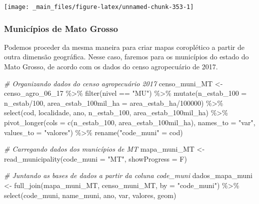 \documentclass[
  brazilian,
]{book}
\newenvironment{Shaded}{\begin{snugshade}}{\end{snugshade}}
\newcommand{\AttributeTok}[1]{\textcolor[rgb]{0.77,0.63,0.00}{#1}}
\newcommand{\CommentTok}[1]{\textcolor[rgb]{0.56,0.35,0.01}{\textit{#1}}}
\newcommand{\DecValTok}[1]{\textcolor[rgb]{0.00,0.00,0.81}{#1}}
\newcommand{\FunctionTok}[1]{\textcolor[rgb]{0.00,0.00,0.00}{#1}}
\newcommand{\NormalTok}[1]{#1}
\newcommand{\OtherTok}[1]{\textcolor[rgb]{0.56,0.35,0.01}{#1}}
\newcommand{\SpecialCharTok}[1]{\textcolor[rgb]{0.00,0.00,0.00}{#1}}
\newcommand{\StringTok}[1]{\textcolor[rgb]{0.31,0.60,0.02}{#1}}
\begin{document}
\begin{center}\texttt{[image: \_main\_files/figure-latex/unnamed-chunk-353-1]} \end{center}

\hypertarget{municuxedpios-de-mato-grosso}{%
\subsubsection*{Municípios de Mato Grosso}\label{municuxedpios-de-mato-grosso}}

Podemos proceder da mesma maneira para criar mapas coroplético a partir de outra dimensão geográfica. Nesse caso, faremos para os municípios do estado do Mato Grosso, de acordo com os dados do censo agropecuário de 2017.

\begin{Shaded}
\begin{Highlighting}[]
\CommentTok{\# Organizando dados do censo agropecuário 2017}
\NormalTok{censo\_muni\_MT }\OtherTok{\textless{}{-}}\NormalTok{ censo\_agro\_06\_17 }\SpecialCharTok{\%\textgreater{}\%} 
  \FunctionTok{filter}\NormalTok{(nivel }\SpecialCharTok{==} \StringTok{"MU"}\NormalTok{) }\SpecialCharTok{\%\textgreater{}\%} 
  \FunctionTok{mutate}\NormalTok{(}\AttributeTok{n\_estab\_100 =}\NormalTok{ n\_estab}\SpecialCharTok{/}\DecValTok{100}\NormalTok{,}
         \AttributeTok{area\_estab\_100mil\_ha =}\NormalTok{ area\_estab\_ha}\SpecialCharTok{/}\DecValTok{100000}\NormalTok{) }\SpecialCharTok{\%\textgreater{}\%} 
  \FunctionTok{select}\NormalTok{(cod, localidade, ano, n\_estab\_100, area\_estab\_100mil\_ha) }\SpecialCharTok{\%\textgreater{}\%}  
  \FunctionTok{pivot\_longer}\NormalTok{(}\AttributeTok{cols =} \FunctionTok{c}\NormalTok{(n\_estab\_100, area\_estab\_100mil\_ha),}
               \AttributeTok{names\_to =} \StringTok{"var"}\NormalTok{,}
               \AttributeTok{values\_to =} \StringTok{"valores"}\NormalTok{) }\SpecialCharTok{\%\textgreater{}\%} 
  \FunctionTok{rename}\NormalTok{(}\StringTok{"code\_muni"} \OtherTok{=}\NormalTok{ cod)}

\CommentTok{\# Carregando dados dos municípios de MT}
\NormalTok{mapa\_muni\_MT }\OtherTok{\textless{}{-}} \FunctionTok{read\_municipality}\NormalTok{(}\AttributeTok{code\_muni =} \StringTok{"MT"}\NormalTok{, }\AttributeTok{showProgress =}\NormalTok{ F)}

\CommentTok{\# Juntando as bases de dados a partir da coluna \textasciigrave{}code\_muni\textasciigrave{}}
\NormalTok{dados\_mapa\_muni }\OtherTok{\textless{}{-}} \FunctionTok{full\_join}\NormalTok{(mapa\_muni\_MT, censo\_muni\_MT, }\AttributeTok{by =} \StringTok{"code\_muni"}\NormalTok{) }\SpecialCharTok{\%\textgreater{}\%} 
  \FunctionTok{select}\NormalTok{(code\_muni, name\_muni, ano, var, valores, geom)}
\end{Highlighting}
\end{Shaded}
\end{document}
